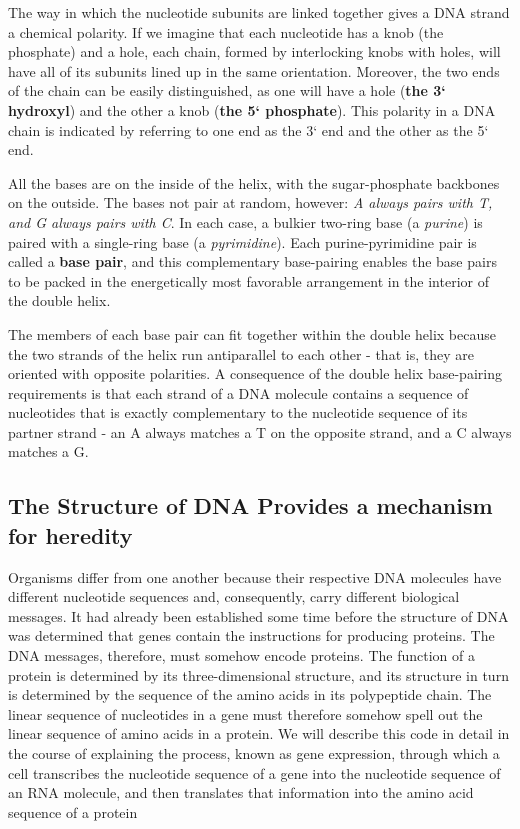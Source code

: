 The way in which the nucleotide subunits are linked together gives a
DNA strand a chemical polarity. If we imagine that each nucleotide has a
knob (the phosphate) and a hole, each chain, formed by
interlocking knobs with holes, will have all of its subunits lined up in the
same orientation. Moreover, the two ends of the chain can be easily distinguished,
as one will have a hole (\textbf{the 3` hydroxyl}) and the other a knob
(\textbf{the 5` phosphate}). This polarity in a DNA chain is indicated by referring
to one end as the 3` end and the other as the 5` end.

All the bases are  on the inside of the helix, with the sugar-phosphate
backbones on the outside. The bases not pair at random, however: \textit{A always pairs with T,
and G always pairs with C}. In each case, a bulkier two-ring base (a \textit{purine}) is paired
with a single-ring base (a \textit{pyrimidine}). Each purine-pyrimidine pair is called a \textbf{base pair},
and this complementary base-pairing
enables the base pairs to be packed in the energetically most favorable
arrangement in the interior of the double helix.

The members of each base pair can fit together within the double helix because the two
strands of the helix run antiparallel to each other - that is, they are oriented
with opposite polarities.
A consequence of the double helix base-pairing requirements is that
each strand of a DNA molecule contains a sequence of nucleotides
that is exactly complementary to the nucleotide sequence of its partner
strand - an A always matches a T on the opposite strand, and a C
always matches a G.

\subsection{The Structure of DNA Provides a mechanism for heredity}

Organisms differ
from one another because their respective DNA molecules have different
nucleotide sequences and, consequently, carry different biological messages.
It had already been established some time before the structure of DNA
was determined that genes contain the instructions for producing proteins.
The DNA messages, therefore, must somehow encode proteins. The function of a protein is
determined by its three-dimensional structure, and its structure in turn is
determined by the sequence of the amino acids in its polypeptide chain.
The linear sequence of nucleotides in a gene must therefore somehow
spell out the linear sequence of amino acids in a protein.
We will describe this code in detail in the course of explaining
the process, known as gene expression, through which a cell transcribes
the nucleotide sequence of a gene into the nucleotide sequence of an
RNA molecule, and then translates that information into the amino acid
sequence of a protein

